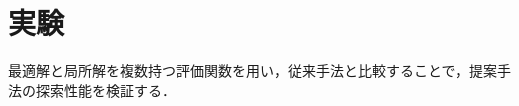 \documentclass[twocolumn, a4paper]{UECIEresume}
\begin{document}

\section{実験}
最適解と局所解を複数持つ評価関数を用い，従来手法と比較することで，提案手法の探索性能を検証する．
\end{document}
